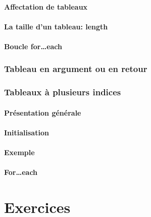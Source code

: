 \documentclass{beamer}
\begin{document}
        \subsection{Affectation de tableaux}\label{subsec:affectation-de-tableaux}
        \subsection{La taille d'un tableau: length}\label{subsec:la-taille-dun-tableau}
        \subsection{Boucle for\ldots each}\label{subsec:boucle-foreach}

    \section{Tableau en argument ou en retour}\label{sec:tableau-en-argument-ou-en-retour}

    \section{Tableaux \`a plusieurs indices}\label{sec:tableaux-a-plusieurs-indices}
        \subsection{Pr\'esentation g\'en\'erale}\label{subsec:presentation-generale}
        \subsection{Initialisation}\label{subsec:initialisation}
        \subsection{Exemple}\label{subsec:exemple}
        \subsection{For\ldots each}\label{subsec:for-each}

    \part{Exercices}
    \frame{\partpage}
\end{document}
